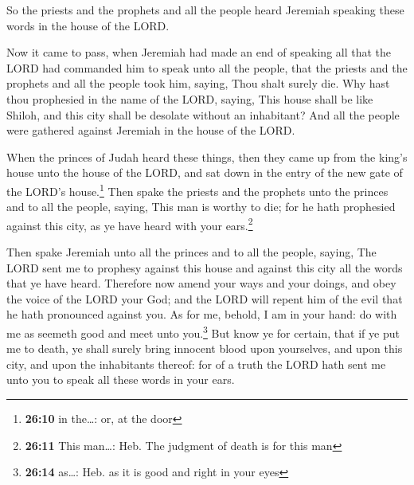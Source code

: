  So the priests and the prophets and all the people heard
Jeremiah speaking these words in the house of the LORD.

 Now it came to pass, when Jeremiah had made an end of
speaking all that the LORD had commanded him to speak unto all the
people, that the priests and the prophets and all the people took him,
saying, Thou shalt surely die.  Why hast thou prophesied
in the name of the LORD, saying, This house shall be like Shiloh, and
this city shall be desolate without an inhabitant? And all the people
were gathered against Jeremiah in the house of the LORD.

 When the princes of Judah heard these things, then they
came up from the king's house unto the house of the LORD, and sat down
in the entry of the new gate of the LORD's house.\footnote{\textbf{26:10}
  in the\ldots: or, at the door}  Then spake the priests
and the prophets unto the princes and to all the people, saying, This
man is worthy to die; for he hath prophesied against this city, as ye
have heard with your ears.\footnote{\textbf{26:11} This man\ldots: Heb.
  The judgment of death is for this man}

 Then spake Jeremiah unto all the princes and to all the
people, saying, The LORD sent me to prophesy against this house and
against this city all the words that ye have heard. 
Therefore now amend your ways and your doings, and obey the voice of the
LORD your God; and the LORD will repent him of the evil that he hath
pronounced against you.  As for me, behold, I am in your
hand: do with me as seemeth good and meet unto you.\footnote{\textbf{26:14}
  as\ldots: Heb. as it is good and right in your eyes} 
But know ye for certain, that if ye put me to death, ye shall surely
bring innocent blood upon yourselves, and upon this city, and upon the
inhabitants thereof: for of a truth the LORD hath sent me unto you to
speak all these words in your ears.

